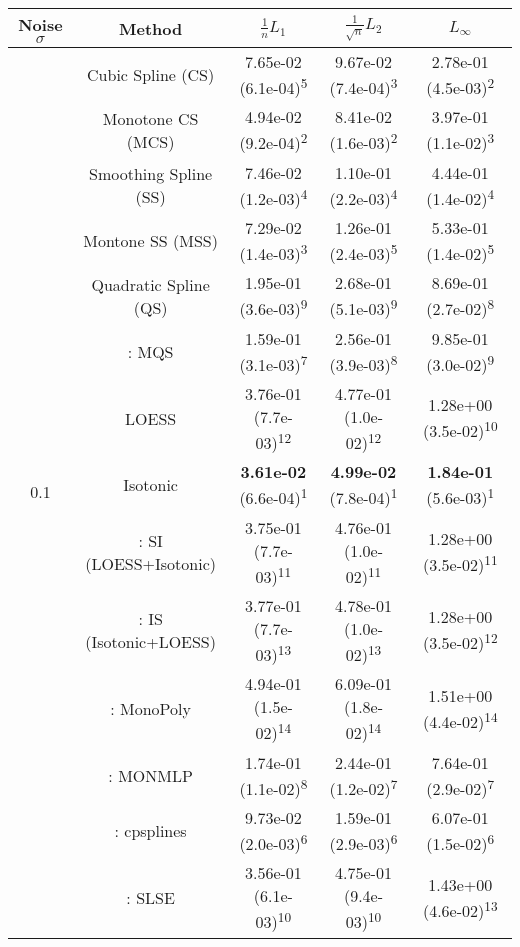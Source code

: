 \begin{tabular}{ccccc}
\toprule
Noise $\sigma$ & Method&$\frac 1n L_1$&$\frac{1}{\sqrt n}L_2$&$L_\infty$\tabularnewline
\midrule
\multirow{14}{*}{0.1}&Cubic Spline (CS)& 7.65e-02 (6.1e-04)\textsuperscript{5}& 9.67e-02 (7.4e-04)\textsuperscript{3}& 2.78e-01 (4.5e-03)\textsuperscript{2}\tabularnewline
&Monotone CS (MCS)& 4.94e-02 (9.2e-04)\textsuperscript{2}& 8.41e-02 (1.6e-03)\textsuperscript{2}& 3.97e-01 (1.1e-02)\textsuperscript{3}\tabularnewline
&Smoothing Spline (SS)& 7.46e-02 (1.2e-03)\textsuperscript{4}& 1.10e-01 (2.2e-03)\textsuperscript{4}& 4.44e-01 (1.4e-02)\textsuperscript{4}\tabularnewline
&Montone SS (MSS)& 7.29e-02 (1.4e-03)\textsuperscript{3}& 1.26e-01 (2.4e-03)\textsuperscript{5}& 5.33e-01 (1.4e-02)\textsuperscript{5}\tabularnewline
&Quadratic Spline (QS)& 1.95e-01 (3.6e-03)\textsuperscript{9}& 2.68e-01 (5.1e-03)\textsuperscript{9}& 8.69e-01 (2.7e-02)\textsuperscript{8}\tabularnewline
&\textcite{heMonotoneBsplineSmoothing1998}: MQS& 1.59e-01 (3.1e-03)\textsuperscript{7}& 2.56e-01 (3.9e-03)\textsuperscript{8}& 9.85e-01 (3.0e-02)\textsuperscript{9}\tabularnewline
&LOESS& 3.76e-01 (7.7e-03)\textsuperscript{12}& 4.77e-01 (1.0e-02)\textsuperscript{12}& 1.28e+00 (3.5e-02)\textsuperscript{10}\tabularnewline
&Isotonic& \textbf{3.61e-02} (6.6e-04)\textsuperscript{1}& \textbf{4.99e-02} (7.8e-04)\textsuperscript{1}& \textbf{1.84e-01} (5.6e-03)\textsuperscript{1}\tabularnewline
&\textcite{mammenEstimatingSmoothMonotone1991}: SI (LOESS+Isotonic)& 3.75e-01 (7.7e-03)\textsuperscript{11}& 4.76e-01 (1.0e-02)\textsuperscript{11}& 1.28e+00 (3.5e-02)\textsuperscript{11}\tabularnewline
&\textcite{mammenEstimatingSmoothMonotone1991}: IS (Isotonic+LOESS)& 3.77e-01 (7.7e-03)\textsuperscript{13}& 4.78e-01 (1.0e-02)\textsuperscript{13}& 1.28e+00 (3.5e-02)\textsuperscript{12}\tabularnewline
&\textcite{murrayFastFlexibleMethods2016a}: MonoPoly& 4.94e-01 (1.5e-02)\textsuperscript{14}& 6.09e-01 (1.8e-02)\textsuperscript{14}& 1.51e+00 (4.4e-02)\textsuperscript{14}\tabularnewline
&\textcite{cannonMonmlpMultilayerPerceptron2017}: MONMLP& 1.74e-01 (1.1e-02)\textsuperscript{8}& 2.44e-01 (1.2e-02)\textsuperscript{7}& 7.64e-01 (2.9e-02)\textsuperscript{7}\tabularnewline
&\textcite{navarro-garciaConstrainedSmoothingOutofrange2023}: cpsplines& 9.73e-02 (2.0e-03)\textsuperscript{6}& 1.59e-01 (2.9e-03)\textsuperscript{6}& 6.07e-01 (1.5e-02)\textsuperscript{6}\tabularnewline
&\textcite{groeneboomConfidenceIntervalsMonotone2023}: SLSE& 3.56e-01 (6.1e-03)\textsuperscript{10}& 4.75e-01 (9.4e-03)\textsuperscript{10}& 1.43e+00 (4.6e-02)\textsuperscript{13}\tabularnewline

\end{tabular}
